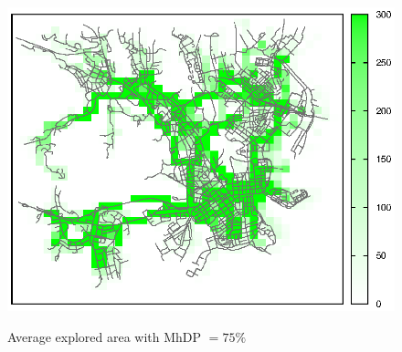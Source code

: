 \begin{figure}[htbp]
{\includegraphics[scale=0.85]{grafici/mappe/M2MShare_3_hop_75perc.eps}}
\caption{Average explored area with MhDP $= 75\%$\label{fig:mappaMultiHop_75}}
\end{figure}

